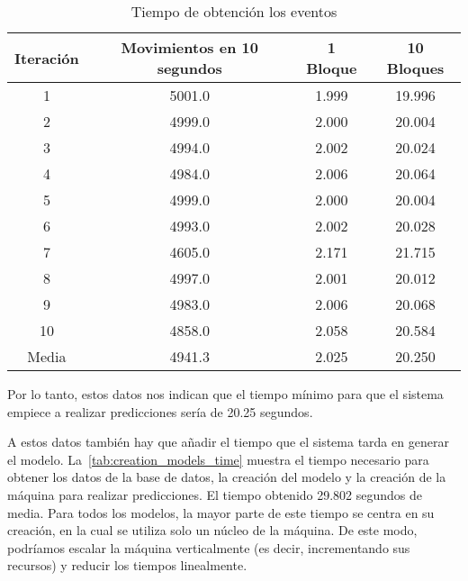 \begin{table}[htbp!]
    \centering
    \begin{tabular}{c c c c}
        \toprule
        Iteración & Movimientos en 10 segundos & 1 Bloque & 10 Bloques \\
        \midrule\midrule
        1         & 5001.0                     & 1.999    & 19.996     \\
        2         & 4999.0                     & 2.000    & 20.004     \\
        3         & 4994.0                     & 2.002    & 20.024     \\
        4         & 4984.0                     & 2.006    & 20.064     \\
        5         & 4999.0                     & 2.000    & 20.004     \\
        6         & 4993.0                     & 2.002    & 20.028     \\
        7         & 4605.0                     & 2.171    & 21.715     \\
        8         & 4997.0                     & 2.001    & 20.012     \\
        9         & 4983.0                     & 2.006    & 20.068     \\
        10         & 4858.0                     & 2.058    & 20.584     \\
        \midrule\midrule
        Media     & 4941.3                     & 2.025    & 20.250     \\
        \bottomrule
    \end{tabular}
    \caption{Tiempo de obtención los eventos}
    \label{tab:events_time}
\end{table}

Por lo tanto, estos datos nos indican que el tiempo mínimo para que el sistema empiece a realizar predicciones sería de 20.25 segundos.

A estos datos también hay que añadir el tiempo que el sistema tarda en generar el modelo. La~\cref{tab:creation_models_time} muestra el tiempo necesario para obtener los datos de la base de datos, la creación del modelo y la creación de la máquina para realizar predicciones. El tiempo obtenido 29.802 segundos de media. Para todos los modelos, la mayor parte de este tiempo se centra en su creación, en la cual se utiliza solo un núcleo de la máquina. De este modo, podríamos escalar la máquina verticalmente (es decir, incrementando sus recursos) y reducir los tiempos linealmente.



